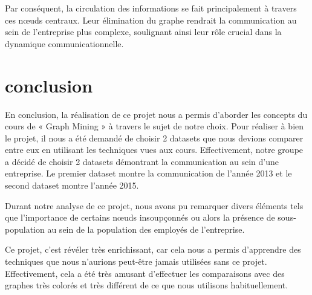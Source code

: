 \documentclass{article}
\begin{document}
Par conséquent, la circulation des informations se fait principalement à travers ces nœuds centraux. Leur élimination du graphe rendrait la communication au sein de l'entreprise plus complexe, soulignant ainsi leur rôle crucial dans la dynamique communicationnelle.

\section{conclusion}

En conclusion, la réalisation de ce projet nous a permis d’aborder les concepts du cours de « Graph Mining » à travers le sujet de notre choix. Pour réaliser à bien le projet, il nous a été demandé de choisir 2 datasets que nous devions comparer entre eux en utilisant les techniques vues aux cours. Effectivement, notre groupe a décidé de choisir 2 datasets démontrant la communication au sein d’une entreprise. Le premier dataset montre la communication de l’année 2013 et le second dataset montre l’année 2015.

Durant notre analyse de ce projet, nous avons pu remarquer divers éléments tels que l’importance de certains nœuds insoupçonnés ou alors la présence de sous-population au sein de la population des employés de l’entreprise.

Ce projet, c’est révéler très enrichissant, car cela nous a permis d’apprendre des techniques que nous n’aurions peut-être jamais utilisées sans ce projet. Effectivement, cela a été très amusant d’effectuer les comparaisons avec des graphes très colorés et très différent de ce que nous utilisons habituellement.
\end{document}
